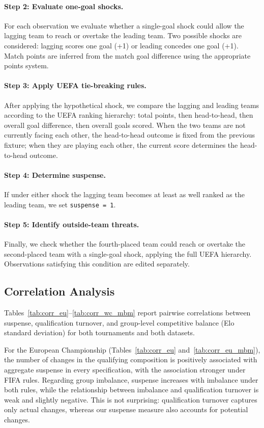 \documentclass[11pt]{article}
\begin{document}
\paragraph{Step 2: Evaluate one-goal shocks.}
For each observation we evaluate whether a single-goal shock could allow the lagging team to reach or overtake the leading team. Two possible shocks are considered: lagging scores one goal (+1) or leading concedes one goal (+1). Match points are inferred from the match goal difference using the appropriate points system.

\paragraph{Step 3: Apply UEFA tie-breaking rules.}
After applying the hypothetical shock, we compare the lagging and leading teams according to the UEFA ranking hierarchy: total points, then head-to-head, then overall goal difference, then overall goals scored. When the two teams are not currently facing each other, the head-to-head outcome is fixed from the previous fixture; when they are playing each other, the current score determines the head-to-head outcome.

\paragraph{Step 4: Determine suspense.}
If under either shock the lagging team becomes at least as well ranked as the leading team, we set \texttt{suspense = 1}.

\paragraph{Step 5: Identify outside-team threats.}
Finally, we check whether the fourth-placed team could reach or overtake the second-placed team with a single-goal shock, applying the full UEFA hierarchy. Observations satisfying this condition are edited separately.


\subsection{Correlation Analysis}
\label{app:correlations}

Tables~\ref{tab:corr_eu}--\ref{tab:corr_wc_mbm} report pairwise correlations between suspense, qualification turnover, and group-level competitive balance (Elo standard deviation) for both tournaments and both datasets.

For the European Championship (Tables~\ref{tab:corr_eu} and~\ref{tab:corr_eu_mbm}), the number of changes in the qualifying composition is positively associated with aggregate suspense in every specification, with the association stronger under FIFA rules. Regarding group imbalance, suspense increases with imbalance under both rules, while the relationship between imbalance and qualification turnover is weak and slightly negative. This is not surprising: qualification turnover captures only actual changes, whereas our suspense measure also accounts for potential changes.
\end{document}
